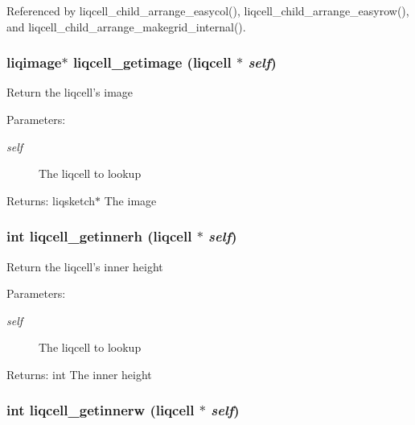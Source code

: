 Referenced by liqcell\_\-child\_\-arrange\_\-easycol(), liqcell\_\-child\_\-arrange\_\-easyrow(), and liqcell\_\-child\_\-arrange\_\-makegrid\_\-internal().
\subsubsection[{liqcell\_\-getimage}]{\setlength{\rightskip}{0pt plus 5cm}liqimage$\ast$ liqcell\_\-getimage (liqcell $\ast$ {\em self})}\label{d5/da2/liqcell_8c_dd146d20bdff3af5df7f9007caedad13}


Return the liqcell's image \begin{Desc}
\item[Parameters:]
\begin{description}
\item[{\em self}]The liqcell to lookup \end{description}
\end{Desc}
\begin{Desc}
\item[Returns:]liqsketch$\ast$ The image \end{Desc}
\subsubsection[{liqcell\_\-getinnerh}]{\setlength{\rightskip}{0pt plus 5cm}int liqcell\_\-getinnerh (liqcell $\ast$ {\em self})}\label{d5/da2/liqcell_8c_43b42b6e72cfef3481ffcdb65ecfe4fe}


Return the liqcell's inner height \begin{Desc}
\item[Parameters:]
\begin{description}
\item[{\em self}]The liqcell to lookup \end{description}
\end{Desc}
\begin{Desc}
\item[Returns:]int The inner height \end{Desc}
\subsubsection[{liqcell\_\-getinnerw}]{\setlength{\rightskip}{0pt plus 5cm}int liqcell\_\-getinnerw (liqcell $\ast$ {\em self})}\label{d5/da2/liqcell_8c_0a196fdaeddee362fb4a8c7c5a173bf2}


